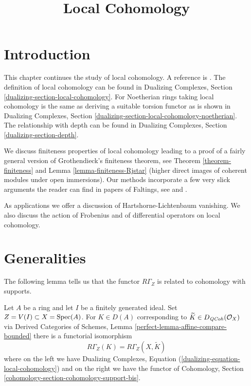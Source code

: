 

%


\title{Local Cohomology}


\maketitle

\label{section-phantom}

\tableofcontents

\section{Introduction}
\label{section-introduction}

\noindent
This chapter continues the study of local cohomology.
A reference is \cite{SGA2}.
The definition of local cohomology can be found in
Dualizing Complexes, Section \ref{dualizing-section-local-cohomology}.
For Noetherian rings taking local cohomology is the same
as deriving a suitable torsion functor as is shown in
Dualizing Complexes, Section
\ref{dualizing-section-local-cohomology-noetherian}.
The relationship with depth can be found in
Dualizing Complexes, Section
\ref{dualizing-section-depth}.

\medskip\noindent
We discuss finiteness properties of local cohomology leading to a proof
of a fairly general version of
Grothendieck's finiteness theorem, see Theorem \ref{theorem-finiteness}
and Lemma \ref{lemma-finiteness-Rjstar} (higher direct images
of coherent modules under open immersions).
Our methods incorporate a few very slick arguments the reader
can find in papers of Faltings, see
\cite{Faltings-annulators} and \cite{Faltings-finiteness}.

\medskip\noindent
As applications we offer a discussion of
Hartshorne-Lichtenbaum vanishing. We also discuss
the action of Frobenius and of differential operators
on local cohomology.




\section{Generalities}
\label{section-generalities}

\noindent
The following lemma tells us that the functor $R\Gamma_Z$
is related to cohomology with supports.

\begin{lemma}
\label{lemma-local-cohomology-is-local-cohomology}
Let $A$ be a ring and let $I$ be a finitely generated ideal.
Set $Z = V(I) \subset X = \mathop{\mathrm{Spec}}(A)$. For $K \in D(A)$ corresponding
to $\widetilde{K} \in D_{\mathit{QCoh}}(\mathcal{O}_X)$ via
Derived Categories of Schemes, Lemma \ref{perfect-lemma-affine-compare-bounded}
there is a functorial isomorphism
$$
R\Gamma_Z(K) = R\Gamma_Z(X, \widetilde{K})
$$
where on the left we have
Dualizing Complexes, Equation (\ref{dualizing-equation-local-cohomology})
and on the right we have the functor of
Cohomology, Section \ref{cohomology-section-cohomology-support-bis}.
\end{lemma}

